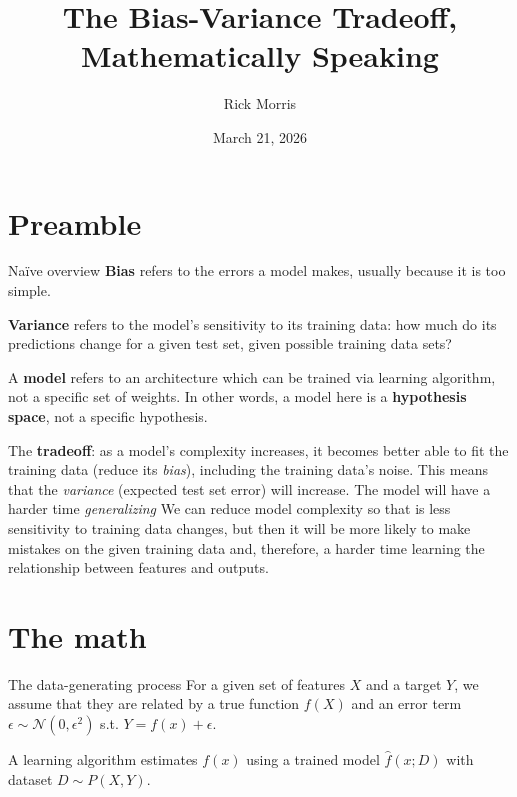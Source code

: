 \documentclass[10pt]{beamer}
\title{The Bias-Variance Tradeoff, Mathematically Speaking}
\date[2026/03/21]{March 21, 2026}
\author[Rick Morris]{Rick Morris}
\begin{document}
	\section{Preamble}
		\begin{frame}
			\titlepage
		\end{frame}
		\begin{frame}{Na\"ive overview}
			\textbf{Bias} refers to the errors a model makes, usually because it is too simple. \vspace{.5cm}
			
			\textbf{Variance} refers to the model's sensitivity to its training data: how much do its predictions change for a given test set, given possible training data sets? \vspace{.5cm}
			
			A \textbf{model} refers to an architecture which can be trained via learning algorithm, not a specific set of weights. In other words, a model here is a \textbf{hypothesis space}, not a specific hypothesis. \vspace{.5cm}
			
			The \textbf{tradeoff}: as a model's complexity increases, it becomes better able to fit the training data (reduce its \textit{bias}), including the training data's noise. This means that the \textit{variance} (expected test set error) will increase. The model will have a harder time \textit{generalizing} We can reduce model complexity so that is less sensitivity to training data changes, but then it will be more likely to make mistakes on the given training data and, therefore, a harder time learning the relationship between features and outputs.
		\end{frame}
	\section{The math}
		\begin{frame}{The data-generating process}
			For a given set of features $X$ and a target $Y$, we assume that they are related by a true function $f(X)$ and an error term $\epsilon\sim\mathcal{N}(0, \epsilon^2)$ s.t. $Y=f(x) + \epsilon$. \vspace{.5cm}
			
			A learning algorithm estimates $f(x)$ using a trained model $\hat{f}(x; D)$ with dataset $D\sim P(X, Y)$. 
		\end{frame}
		
\end{document}
